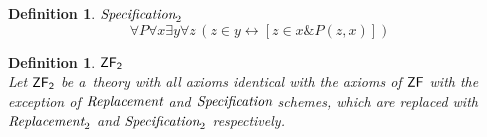 \documentclass[12pt,a4paper]{article}
\newtheorem{definition}[theorem]{Definition}
\renewcommand{\iff}{\leftrightarrow}
\begin{document}
\begin{definition}{$\emph{Specification}_2$}\\
\begin{equation}
\forall P \forall x \exists y \forall z \, ( z \in y \iff [ z \in x \& P(z, x) ] )
\end{equation}
\end{definition}

\begin{definition}{$\sf{ZF}_2$}\\
Let $\sf{ZF}_2$ be a~theory with all axioms identical with the axioms of $\sf{ZF}$ with the exception of $\emph{Replacement}$ and $\emph{Specification}$ schemes, which are replaced with $\emph{Replacement}_2$ and $\emph{Specification}_2$ respectively.
\end{definition}












\end{document}
